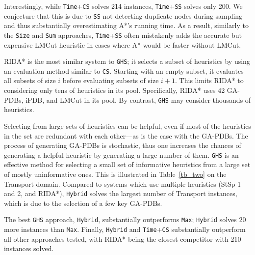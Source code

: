 Interestingly, while \texttt{Time}+\texttt{CS} solves 214 instances, \texttt{Time}+\texttt{SS} solves only 200. We conjecture that this is due to \texttt{SS} not detecting duplicate nodes during sampling and thus substantially overestimating A*'s running time. As a result, similarly to the \texttt{Size} and \texttt{Sum} approaches, \texttt{Time}+\texttt{SS} often mistakenly adds the accurate but expensive LMCut heuristic in cases where A*  would be faster without LMCut. %

RIDA* is the most similar system to \texttt{GHS}; it selects a subset of heuristics by using an evaluation method similar to \texttt{CS}. %
Starting with an empty subset, it evaluates all subsets of size $i$ before evaluating subsets of size $i+1$. This limits RIDA* to considering only tens of heuristics in its pool. Specifically, RIDA* uses 42 GA-PDBs, iPDB, and LMCut in its pool. By contrast, \texttt{GHS} may consider thousands of heuristics. %
%

Selecting from large sets of heuristics can be helpful, %
even if most of the heuristics in the set are redundant with each other---as is the case with the GA-PDBs. The process of generating GA-PDBs is stochastic, thus one increases the chances of generating a helpful heuristic by generating a large number of them. \texttt{GHS} is an effective method for selecting a small set of informative heuristics from a large set of mostly uninformative ones. This is illustrated in Table~\ref{tb_two} on the Transport domain. Compared to systems which use multiple heuristics (StSp 1 and 2, and RIDA*), \texttt{Hybrid} solves the largest number of Transport instances, which is due to the selection of a few key GA-PDBs.

The best \texttt{GHS} approach, \texttt{Hybrid}, substantially outperforms  \texttt{Max}; \texttt{Hybrid} solves 20 more instances than \texttt{Max}. Finally, \texttt{Hybrid} and \texttt{Time}+\texttt{CS} substantially outperform all other approaches tested, with RIDA* being the closest competitor with 210 instances solved. 


